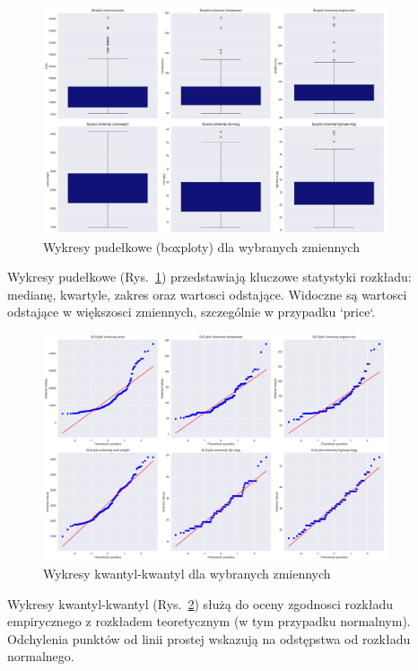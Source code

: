 \documentclass[12pt,a4paper]{article}
\begin{document}
\begin{figure}[H]
    \centering
    \includegraphics[width=0.9\textwidth]{figures/boxplots.png}
    \caption{Wykresy pudełkowe (boxploty) dla wybranych zmiennych}
    \label{fig:boxplots}
\end{figure}

Wykresy pudełkowe (Rys.~\ref{fig:boxplots}) przedstawiają kluczowe statystyki rozkładu: medianę, kwartyle, zakres oraz wartosci odstające. Widoczne są wartosci odstające w większosci zmiennych, szczególnie w przypadku `price`.

\begin{figure}[H]
    \centering
    \includegraphics[width=0.9\textwidth]{figures/qq_plots.png}
    \caption{Wykresy kwantyl-kwantyl dla wybranych zmiennych}
    \label{fig:qq_plots}
\end{figure}

Wykresy kwantyl-kwantyl (Rys.~\ref{fig:qq_plots}) służą do oceny zgodnosci rozkładu empirycznego z rozkładem teoretycznym (w tym przypadku normalnym). Odchylenia punktów od linii prostej wskazują na odstępstwa od rozkładu normalnego.
\end{document}

